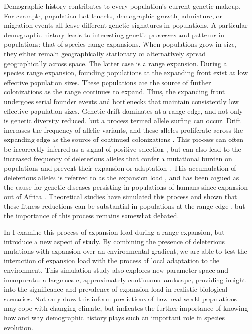 Demographic history contributes to every population's current genetic makeup. For example, population bottlenecks, demographic growth, admixture, or migration events all leave different genetic signatures in populations. A particular demographic history leads to interesting genetic processes and patterns in populations: that of species range expansions. When populations grow in size, they either remain geographically stationary or alternatively spread geographically across space. The latter case is a range expansion. During a species range expansion, founding populations at the expanding front exist at low effective population sizes. These populations are the source of further colonizations as the range continues to expand. Thus, the expanding front undergoes serial founder events and bottlenecks that maintain consistently low effective population sizes. Genetic drift dominates at a range edge, and not only is genetic diversity reduced, but a process termed allele surfing can occur. Drift increases the frequency of allelic variants, and these alleles proliferate across the expanding edge as the source of continued colonizations \citep{Klopfstein:2006}. This process can often be incorrectly inferred as a signal of positive selection \citep{Edmonds:2004}, but can also lead to the increased frequency of deleterious alleles that confer a mutational burden on populations and prevent their expansion or adaptation \citep{Peischl:2013, Peischl:2015, Excoffier:2009}. This accumulation of deleterious alleles is referred to as the expansion load \citep{Peischl:2013}, and has been argued as the cause for genetic diseases persisting in populations of humans since expansion out of Africa \citep{Henn:2015, Henn:2015b, Lohmueller:2008, Lohmueller:2014b, Do:2015}. Theoretical studies have simulated this process and shown that these fitness reductions can be substantial in populations at the range edge \citep{Peischl:2013, Peischl:2015, Peischl:2015b}, but the importance of this process remains somewhat debated.

In  I examine this process of expansion load during a range expansion, but introduce a new aspect of study. By combining the presence of deleterious mutations with expansion over an environmental gradient, we are able to test the interaction of expansion load with the process of local adaptation to the environment. This simulation study also explores new parameter space and incorporates a large-scale, approximately continuous landscape, providing insight into the significance and prevalence of expansion load in realistic biological scenarios. Not only does this inform predictions of how real world populations may cope with changing climate, but indicates the further importance of knowing how and why demographic history plays such an important role in species evolution.

